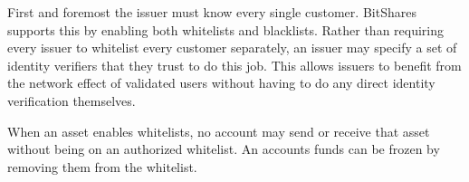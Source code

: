 First and foremost the issuer must know every single customer. BitShares
supports this by enabling both whitelists and blacklists. Rather than
requiring every issuer to whitelist every customer separately, an issuer may
specify a set of identity verifiers that they trust to do this job. This
allows issuers to benefit from the network effect of validated users without
having to do any direct identity verification themselves.

When an asset enables whitelists, no account may send or receive that asset
without being on an authorized whitelist. An accounts funds can be frozen by
removing them from the whitelist.
